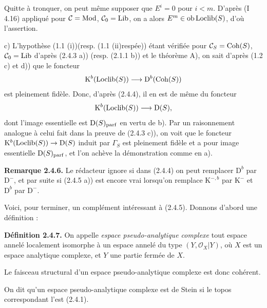 Quitte à tronquer, on peut même supposer que $E^i=0$ pour $i<m$. D'après (I 4.16) appliqué pour $\mathcal C=\Mod$, $\mathcal C_0=\Lib$, on a alors $E^m\in\Ob\Loclib(S)$, d'où l'assertion.

c) L'hypothèse (1.1 (i))(resp. (1.1 (ii)respée)) étant vérifiée pour $\mathcal C_S=\Coh(S)$, $\mathcal C_0=\Lib$ d'après (2.4.3 a)) (resp. (2.1.1 b)) et le théorème A), on sait d'après (1.2 c) et d)) que le foncteur
\[
\mathrm K^b(\Loclib(S))\longrightarrow\mathrm D^b(\Coh(S))
\]
est pleinement fidèle. Donc, d'après (2.4.4), il en est de même du foncteur
\[
\mathrm K^b(\Loclib(S))\longrightarrow\mathrm D(S),
\]
dont l'image essentielle est $\mathrm D(S)_{\parf}$ en vertu de b). Par un raisonnement analogue à celui fait dans la preuve de (2.4.3 c)), on voit que le foncteur $\mathrm K^b(\Loclib(S))\to\mathrm D(S)$ induit par $\Gamma_S$ est pleinement fidèle et a pour image essentielle $\mathrm D(S)_{\parf}$, et l'on achève la démonstration comme en a).

\textbf{Remarque 2.4.6.} Le rédacteur ignore si dans (2.4.4) on peut remplacer $\mathrm D^b$ par $\mathrm D^{-}$, et par suite si (2.4.5 a)) est encore vrai lorsqu'on remplace $\mathrm K^{-,b}$ par $\mathrm K^{-}$ et $\mathrm D^b$ par $\mathrm D^{-}$.

Voici, pour terminer, un complément intéressant à (2.4.5). Donnons d'abord une définition :

\textbf{Définition 2.4.7.} On appelle \emph{espace pseudo-analytique complexe} tout espace annelé localement isomorphe à un espace annelé du type $(Y,\mathcal O_X|Y)$, où $X$ est un espace analytique complexe, et $Y$ une partie fermée de $X$.

Le faisceau structural d'un espace pseudo-analytique complexe est donc cohérent.

On dit qu'un espace pseudo-analytique complexe est de Stein si le topos correspondant l'est (2.4.1).



\providecommand{\Qcoh}{\operatorname{Qcoh}}
\providecommand{\Mod}{\operatorname{Mod}}
\providecommand{\Coh}{\operatorname{Coh}}
\renewcommand{\Ob}{\operatorname{ob}}
\providecommand{\Hom}{\operatorname{Hom}}
\providecommand{\Ext}{\operatorname{Ext}}
\providecommand{\Spec}{\operatorname{Spec}}
\providecommand{\qcoh}{\mathrm{qcoh}}
\providecommand{\parf}{\mathrm{parf}}
\providecommand{\coh}{\mathrm{coh}}
\providecommand{\Loclib}{\operatorname{Loclib}}
\providecommand{\Lib}{\operatorname{Lib}}
\providecommand{\im}{\operatorname{Im}}

